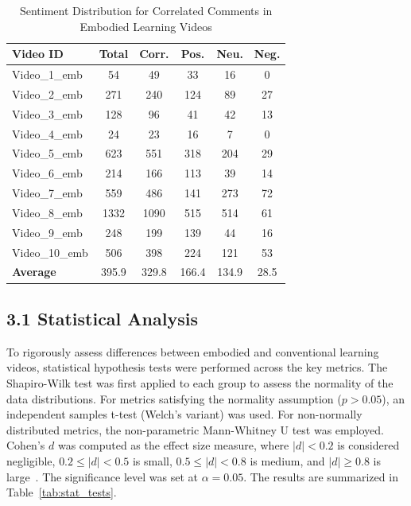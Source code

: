 \documentclass[12pt]{article}
\begin{document}
\begin{table}[H] %
    \centering
    \caption{Sentiment Distribution for Correlated Comments in Embodied Learning Videos}
    \label{tab:emb_integrated}
    \small %
    \begin{tabularx}{\linewidth}{l @{\extracolsep{\fill}} ccccc}
        \toprule
        \textbf{Video ID} & \textbf{Total} & \textbf{Corr.} & \textbf{Pos.} & \textbf{Neu.} & \textbf{Neg.} \\
        \midrule
        Video\_1\_emb  & 54   & 49   & 33  & 16  & 0   \\
        Video\_2\_emb  & 271  & 240  & 124 & 89  & 27  \\
        Video\_3\_emb  & 128  & 96   & 41  & 42  & 13  \\
        Video\_4\_emb  & 24   & 23   & 16  & 7   & 0   \\
        Video\_5\_emb  & 623  & 551  & 318 & 204 & 29  \\
        Video\_6\_emb  & 214  & 166  & 113 & 39  & 14  \\
        Video\_7\_emb  & 559  & 486  & 141 & 273 & 72  \\ 
        Video\_8\_emb  & 1332 & 1090 & 515 & 514 & 61  \\
        Video\_9\_emb  & 248  & 199  & 139 & 44  & 16  \\
        Video\_10\_emb & 506  & 398  & 224 & 121 & 53  \\
        \textbf{Average} & 395.9 & 329.8 & 166.4 & 134.9 & 28.5 \\
        \bottomrule
    \end{tabularx}
\end{table}


\subsection*{3.1 Statistical Analysis}

To rigorously assess differences between embodied and conventional learning videos, statistical hypothesis tests were performed across the key metrics. The Shapiro-Wilk test was first applied to each group to assess the normality of the data distributions. For metrics satisfying the normality assumption ($p > 0.05$), an independent samples t-test (Welch's variant) was used. For non-normally distributed metrics, the non-parametric Mann-Whitney U test was employed. Cohen's $d$ was computed as the effect size measure, where $|d| < 0.2$ is considered negligible, $0.2 \le |d| < 0.5$ is small, $0.5 \le |d| < 0.8$ is medium, and $|d| \ge 0.8$ is large~\cite{cohen1988statistical}. The significance level was set at $\alpha = 0.05$. The results are summarized in Table~\ref{tab:stat_tests}.
\end{document}
